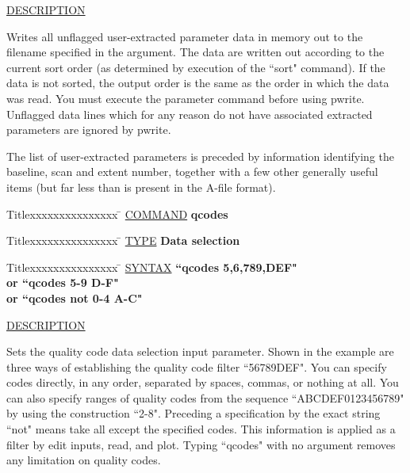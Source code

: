 \underline{DESCRIPTION}
\begin{list}{}{\setlength{\leftmargin}{0.5in}
     \setlength{\rightmargin}{0in}}
\item
Writes all unflagged user-extracted parameter data in memory out 
to the filename specified in the argument.  The data are written out
according to the current sort order (as determined by
execution of the ``sort" command).  If the data is not
sorted, the output order is the same as the order in
which the data was read.  You must execute the parameter command
before using pwrite.  Unflagged data lines which for any reason
do not have associated extracted parameters are ignored by pwrite.
\item
The list of user-extracted parameters is preceded by information
identifying the baseline, scan and extent number, together with
a few other generally useful items (but far less than is present
in the A-file format).
\end{list}
\vspace{.2in}

\begin{tabbing}
Titlexxxxxxxxxxxxxxx \= \kill
\underline{COMMAND} \> {\bf 	qcodes} \\
\end{tabbing}

\begin{tabbing}
Titlexxxxxxxxxxxxxxx \= \kill
\underline{TYPE} \> {\bf 		Data selection} \\
\end{tabbing}

\begin{tabbing}
Titlexxxxxxxxxxxxxxx \= \kill
\underline{SYNTAX} \> {\bf 		``qcodes 5,6,789,DEF"} \\
\> {\bf 	    or  ``qcodes 5-9 D-F"} \\
\> {\bf 	    or  ``qcodes not 0-4 A-C"} \\
\end{tabbing}

\underline{DESCRIPTION}
\begin{list}{}{\setlength{\leftmargin}{0.5in}
     \setlength{\rightmargin}{0in}}
\item
Sets the quality code data selection input parameter.  Shown
in the example are three ways of establishing the quality code
filter ``56789DEF".  You can specify codes directly, in any order,
separated by spaces, commas, or nothing at all.  You can also
specify ranges of quality codes from the sequence ``ABCDEF0123456789"
by using the construction ``2-8".  Preceding a specification by the
exact string ``not" means take all except the specified codes.  This
information is applied as a filter by edit inputs, read, and plot.
Typing ``qcodes" with no argument removes any limitation on quality
codes.
\end{list}
\vspace{.2in}

